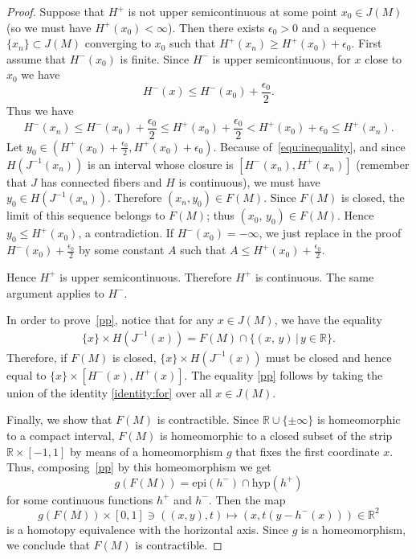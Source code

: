 \documentclass[11pt]{article}
\renewcommand{\geq}{\geqslant}
\renewcommand{\leq}{\leqslant}
\begin{document}
\begin{proof}
Suppose that $H^+$ is not upper semicontinuous at some point $x_0 \in
J(M)$ (so we must have $H^+(x_0)<\infty$).  Then there exists
$\epsilon_0>0$ and a sequence $\{x_n\} \subset J(M)$ converging to
$x_0$ such that $H^+(x_n)\geq H^+(x_0)+\epsilon_0$.  First assume that
$H^-(x_0)$ is finite. Since $H^-$ is upper semicontinuous, for $x$
close to $x_0$ we have
\[
H^-(x) \leq H^-(x_0)+\frac{\epsilon_0}{2}.
\]
Thus we have
\begin{equation}
  H^-(x_n) \leq H^-(x_0) + \frac{\epsilon_0}{2}\leq
  H^+(x_0)+\frac{\epsilon_0}{2} < H^+(x_0)+\epsilon_0\leq 
  H^+(x_n).
  \label{equ:inequality}
\end{equation}
Let $y_0\in (H^+(x_0)+\frac{\epsilon_0}{2},
H^+(x_0)+\epsilon_0)$. Because of~\eqref{equ:inequality}, and since
$H(J^{-1}(x_n))$ is an interval whose closure is $[H^-(x_n),H^+(x_n)]$
(remember that $J$ has connected fibers and $H$ is continuous), we
must have $y_0\in H(J^{-1}(x_n))$.  Therefore $(x_n,y_0)\in F(M)$.
Since $F(M)$ is closed, the limit of this sequence belongs to $F(M)$;
thus $(x_0,\,y_0) \in F(M)$.  Hence $y_0 \leq H^+(x_0)$, a
contradiction. If $H^-(x_0)=-\infty$, we just replace in the proof
$H^-(x_0) + \frac{\epsilon_0}{2}$ by some constant $A$ such that
$A\leq H^+(x_0)+\frac{\epsilon_0}2$.

Hence $H^{+}$ is upper semicontinuous.  Therefore $H^{+}$ is
continuous. The same argument applies to $H^-$.

In order to prove~\eqref{pp}, notice that for any $x\in J(M)$, we have
the equality
\begin{eqnarray} \label{identity:for} \{x \} \times H(J^{-1}(x))=F(M)
  \cap \{ (x,\,y) \, | \, y \in \mathbb{R}\}.
\end{eqnarray}
Therefore, if $F(M)$ is closed, $\{x \} \times H(J^{-1}(x))$ must be
closed and hence equal to $\{x \} \times [H^-(x),H^+(x)]$.  The
equality \eqref{pp} follows by taking the union of the identity
\eqref{identity:for} over all $x \in J(M)$.

Finally, we show that $F(M)$ is contractible. Since
$\mathbb{R}\cup\{\pm\infty\}$ is homeomorphic to a compact interval,
$F(M)$ is homeomorphic to a closed subset of the strip
$\mathbb{R}\times [-1,1]$ by means of a homeomorphism $g$ that fixes
the first coordinate $x$. Thus, composing~\eqref{pp} by this
homeomorphism we get
\[
g(F(M))=\text{epi}(h^-)\cap \text{hyp}(h^+)
\]
for some continuous functions $h^+$ and $h^-$.  Then the map
\[
g(F(M))\times [0,1] \ni((x,y),t) \mapsto (x,t(y-h^-(x))) \in
\mathbb{R}^2
\]
is a homotopy equivalence with the horizontal axis. Since $g$ is a
homeomorphism, we conclude that $F(M)$ is contractible.
\end{proof}
\end{document}
